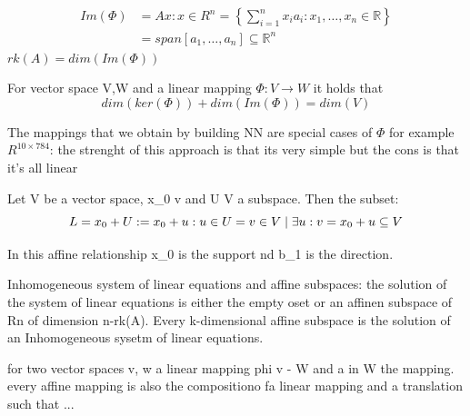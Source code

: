 \begin{align*}
    Im(\Phi) &= {Ax: x \in R^n } = \left\{ \sum_{i=1}^{n}{x_ia_i:x_{1}, \ldots,x_{n} \in \mathbb{R}} \right\}\\ &= span[a_{1}, \ldots,a_{n}] \subseteq \mathbb{R}^n
\end{align*}
$ rk(A) = dim(Im(\Phi)) $
\begin{theorem}
    For vector space V,W and a linear mapping $ \Phi: V \rightarrow W  $ it holds that \[ 
        dim(ker(\Phi)) + dim(Im(\Phi)) = dim(V)
    \]
\end{theorem}
The mappings that we obtain by building NN are special cases of $ \Phi $ for example $ R^{10\times784} $: the strenght of this approach is that its very simple but the cons is that it's all linear
\begin{definition}
    Let V be a vector space, x_0 \in v and U \subseteq V a subspace. Then the subset: \[ 
        L = x_0 + U : = {x_0+u: u\in U} \\
        ={v\in V \mid \exists u : v = x_0 +u} \subseteq V
    \]
\end{definition}
In this affine relationship x_0 is the support nd b_1 is the direction.
\begin{remark}
    Inhomogeneous system of linear equations and affine subspaces:
    the solution of the system of linear equations  is either the empty oset or an affinen subspace of Rn of dimension n-rk(A). Every k-dimensional affine subspace is the solution of an Inhomogeneous sysetm of linear equations. 
\end{remark}
\begin{definition}
    for two vector spaces v, w a linear mapping phi v - W and a in W the mapping.\\
    every affine mapping is also the compositiono fa linear mapping and a translation such that ...
\end{definition}
